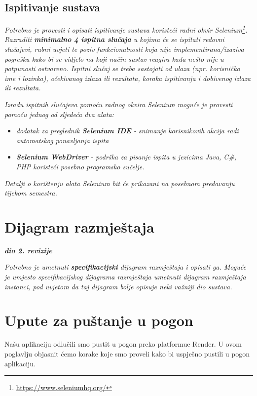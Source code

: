 			
			
			\subsection{Ispitivanje sustava}
			
			 \textit{Potrebno je provesti i opisati ispitivanje sustava koristeći radni okvir Selenium\footnote{\url{https://www.seleniumhq.org/}}. Razraditi \textbf{minimalno 4 ispitna slučaja} u kojima će se ispitati redovni slučajevi, rubni uvjeti te poziv funkcionalnosti koja nije implementirana/izaziva pogrešku kako bi se vidjelo na koji način sustav reagira kada nešto nije u potpunosti ostvareno. Ispitni slučaj se treba sastojati od ulaza (npr. korisničko ime i lozinka), očekivanog izlaza ili rezultata, koraka ispitivanja i dobivenog izlaza ili rezultata.\\ }
			 
			 \textit{Izradu ispitnih slučajeva pomoću radnog okvira Selenium moguće je provesti pomoću jednog od sljedeća dva alata:}
			 \begin{itemize}
			 	\item \textit{dodatak za preglednik \textbf{Selenium IDE} - snimanje korisnikovih akcija radi automatskog ponavljanja ispita	}
			 	\item \textit{\textbf{Selenium WebDriver} - podrška za pisanje ispita u jezicima Java, C\#, PHP koristeći posebno programsko sučelje.}
			 \end{itemize}
		 	\textit{Detalji o korištenju alata Selenium bit će prikazani na posebnom predavanju tijekom semestra.}
			
			\eject 
		
		
		\section{Dijagram razmještaja}
			
			\textbf{\textit{dio 2. revizije}}
			
			 \textit{Potrebno je umetnuti \textbf{specifikacijski} dijagram razmještaja i opisati ga. Moguće je umjesto specifikacijskog dijagrama razmještaja umetnuti dijagram razmještaja instanci, pod uvjetom da taj dijagram bolje opisuje neki važniji dio sustava.}
			
			\eject 
		
		\section{Upute za puštanje u pogon}
		\indent Našu aplikaciju odlučili smo pustit u pogon preko platformue Render. U ovom poglavlju objasnit ćemo korake koje smo proveli kako bi uspješno pustili u pogon aplikaciju.\newline
	
